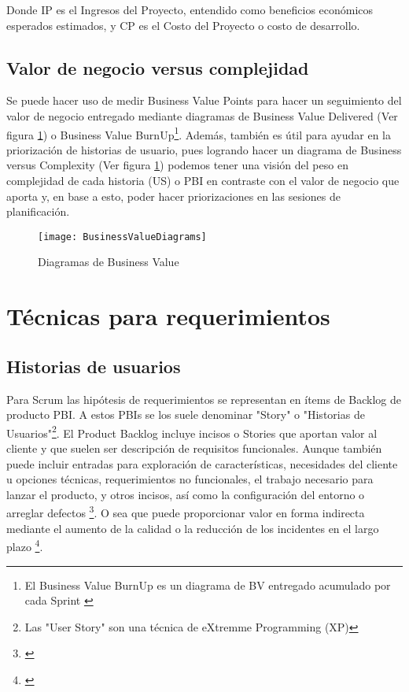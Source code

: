 Donde IP es el Ingresos del Proyecto, entendido como beneficios económicos esperados estimados, y CP es el Costo del Proyecto o costo de desarrollo.

\subsection{Valor de negocio versus complejidad}

Se puede hacer uso de medir Business Value Points para hacer un seguimiento del valor de negocio entregado mediante diagramas de Business Value Delivered (Ver figura \ref{fig:BusinessValueDiagrams}) o Business Value BurnUp\footnote{El Business Value BurnUp es un diagrama de BV entregado acumulado por cada Sprint \cite{Scrum-Alliance-2005}}. Además, también es útil para ayudar en la priorización de historias de usuario, pues logrando hacer un diagrama de Business versus Complexity (Ver figura \ref{fig:BusinessValueDiagrams}) podemos tener una visión del peso en complejidad de cada historia (US) o PBI en contraste con el valor de negocio que aporta y, en base a esto, poder hacer priorizaciones en las sesiones de planificación.

\begin{figure}[h]
  \centering
  \texttt{[image: BusinessValueDiagrams]}
  \caption{Diagramas de Business Value}
  \centering
  \label{fig:BusinessValueDiagrams} %
\end{figure}

\newpage
\section{Técnicas para requerimientos}

\subsection{Historias de usuarios}

Para Scrum las hipótesis de requerimientos se representan en ítems de Backlog de producto PBI. A estos PBIs se los suele denominar "Story" o "Historias de Usuarios"\footnote{Las "User Story" son una técnica de eXtremme Programming (XP)}. El Product Backlog incluye incisos o Stories que aportan valor al cliente y que suelen ser descripción de requisitos funcionales. Aunque también puede incluir entradas para exploración de características, necesidades del cliente u opciones técnicas, requerimientos no funcionales, el trabajo necesario para lanzar el producto, y otros incisos, así como la configuración del entorno o arreglar defectos \footnote{\cite{Scrum-Institute-2015}}. O sea que puede proporcionar valor en forma indirecta mediante el aumento de la calidad o la reducción de los incidentes en el largo plazo \footnote{\cite{Scrum-Institute-2015}}.

